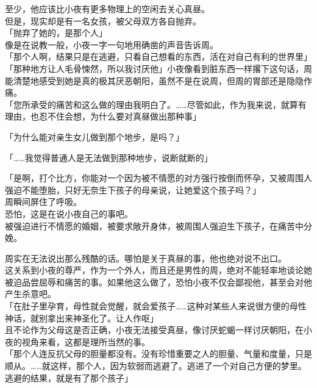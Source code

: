至少，他应该比小夜有更多物理上的空闲去关心真昼。\\

但是，现实却是有一名女孩，被父母双方各自抛弃。\\

「抛弃了她的，是那个人」\\

像是在说教一般，小夜一字一句地用确凿的声音告诉周。\\

「那个人啊，结果只是在逃避，只看自己想看的东西，活在对自己有利的世界里」\\

「那种地方让人毛骨悚然，所以我讨厌他」小夜像看到脏东西一样撂下这句话，周能清楚地感受到她是真的极其厌恶朝阳，虽然不是在说周，但周的胃部还是隐隐作痛。\\

「您所承受的痛苦和这么做的理由我明白了。……尽管如此，作为我来说，就算有理由，也忍不住会想，为什么要对真昼做出那种事」

「为什么能对亲生女儿做到那个地步，是吗？」

「……我觉得普通人是无法做到那种地步，说断就断的」

「是啊，打个比方，你能对一个因为被不情愿的对方强行按倒而怀孕，又被周围人强迫不能堕胎，只好无奈生下孩子的母亲说，让她爱这个孩子吗？」\\

周瞬间屏住了呼吸。\\

恐怕，这是在说小夜自己的事吧。\\

被强迫进行不情愿的婚姻，被要求敞开身体，被周围人强迫生下孩子，在痛苦中分娩。

周实在无法说出那么残酷的话。哪怕是关于真昼的事，他也绝对说不出口。\\

这关系到小夜的尊严，作为一个外人，而且还是男性的周，绝对不能轻率地谈论她被迫品尝屈辱和痛苦的事。如果他这么做了，恐怕小夜不仅会鄙视他，甚至会对他产生杀意吧。\\

「在肚子里孕育，母性就会觉醒，就会爱孩子……这种对某些人来说很方便的母性神话，就别拿出来神圣化了。让人作呕」\\

且不论作为父母这是否正确，小夜无法接受真昼，像讨厌蛇蝎一样讨厌朝阳，在小夜的视角来看，这都是理所当然的事。\\

「那个人连反抗父母的胆量都没有。没有珍惜重要之人的胆量、气量和度量，只是顺从。……就这样，那个人，因为软弱而逃避了。逃进了一个对自己方便的梦里。逃避的结果，就是有了那个孩子」\\

